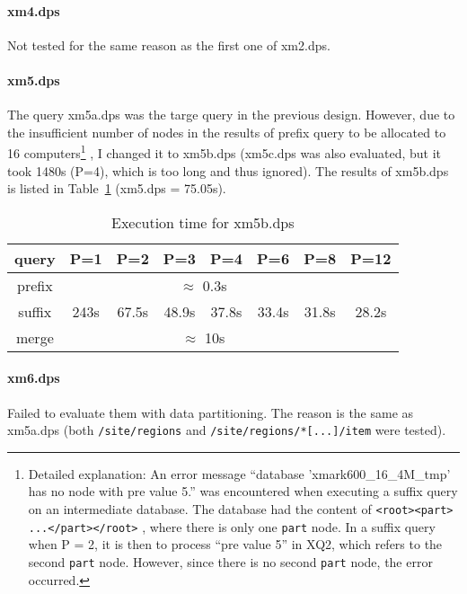 \paragraph{xm4.dps}
Not tested for the same reason as the first one of xm2.dps.

\paragraph{xm5.dps}

The query xm5a.dps was the targe query in the previous design. 
However, due to the insufficient number of nodes in the results of prefix 
query to be allocated to 16 
computers\footnote{
Detailed explanation: An error message 
``database 'xmark600\_16\_4M\_tmp' has no node with pre value 5.'' was
encountered when executing a suffix query on an intermediate database.
The database had the content of  \texttt{<root><part> ...</part></root>} , 
where there is only one \texttt{part} node. 
In a suffix query when P = 2, it is then to process ``pre value 5'' in XQ2, 
which refers to the second \texttt{part} node. However, since there is 
no second \texttt{part} node, the error occurred.
}
, I changed it to xm5b.dps (xm5c.dps was also evaluated, but 
it took 1480s (P=4), which is too long and thus ignored). 
The results of xm5b.dps is listed in Table~\ref{tab:xm5b.dps}
(xm5.dps = 75.05s). 

\begin{table}
	\centering
	\label{tab:xm5b.dps}
	\caption{Execution time for xm5b.dps}
	\begin{tabular}{c|c|c|c|c|c|c|c}
		\hline
		query    &  P=1  &  P=2   &  P=3  &  P=4 &   P=6 &    P=8 & P=12   \\
		\hline
		prefix    &   \multicolumn{6}{|c}{$\approx$ 0.3s}    \\
		\hline
		suffix    & 243s & 67.5s &  48.9s & 37.8s & 33.4s&   31.8s &   28.2s \\ 
		\hline
		merge     &   \multicolumn{6}{|c}{$\approx$ 10s}    \\
		\hline
	\end{tabular} 
\end{table} 



\paragraph{xm6.dps}

Failed to evaluate them with data partitioning. The reason is 
the same as xm5a.dps (both \texttt{/site/regions} and 
\texttt{/site/regions/*[...]/item} were tested).



